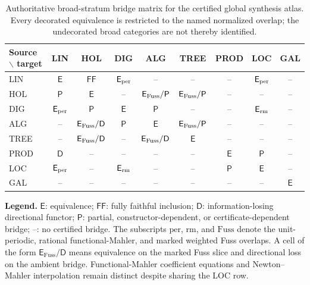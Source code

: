 \begin{landscape}
\begin{table}[p]
\centering
\caption{Authoritative broad-stratum bridge matrix for the certified global synthesis atlas. Every decorated equivalence is restricted to the named normalized overlap; the undecorated broad categories are not thereby identified.}
\label{tab:block13-bridge-matrix}
\scriptsize
\setlength{\tabcolsep}{3.7pt}
\begin{tabular}{@{}lcccccccc@{}}
\toprule
Source $\backslash$ target & LIN & HOL & DIG & ALG & TREE & PROD & LOC & GAL\\
\midrule
LIN  & $\mathsf E$ & $\mathsf{FF}$ & $\mathsf E_{\rm per}$ & -- & -- & -- & $\mathsf E_{\rm per}$ & --\\
HOL  & $\mathsf P$ & $\mathsf E$ & -- & $\mathsf E_{\rm Fuss}/\mathsf P$ & $\mathsf E_{\rm Fuss}/\mathsf P$ & -- & -- & --\\
DIG  & $\mathsf E_{\rm per}$ & $\mathsf P$ & $\mathsf E$ & $\mathsf P$ & -- & -- & $\mathsf E_{\rm rm}$ & --\\
ALG  & -- & $\mathsf E_{\rm Fuss}/\mathsf D$ & $\mathsf P$ & $\mathsf E$ & $\mathsf E_{\rm Fuss}/\mathsf P$ & -- & -- & --\\
TREE & -- & $\mathsf E_{\rm Fuss}/\mathsf D$ & -- & $\mathsf E_{\rm Fuss}/\mathsf D$ & $\mathsf E$ & -- & -- & --\\
PROD & $\mathsf D$ & -- & -- & -- & -- & $\mathsf E$ & $\mathsf P$ & --\\
LOC  & $\mathsf E_{\rm per}$ & -- & $\mathsf E_{\rm rm}$ & -- & -- & $\mathsf P$ & $\mathsf E$ & --\\
GAL  & -- & -- & -- & -- & -- & -- & -- & $\mathsf E$\\
\bottomrule
\end{tabular}
\vspace{5pt}
\parbox{0.96\linewidth}{\scriptsize
\textbf{Legend.} $\mathsf E$: equivalence; $\mathsf{FF}$: fully faithful inclusion; $\mathsf D$: information-losing directional functor; $\mathsf P$: partial, constructor-dependent, or certificate-dependent bridge; --: no certified bridge. The subscripts $\mathrm{per}$, $\mathrm{rm}$, and $\mathrm{Fuss}$ denote the unit-periodic, rational functional-Mahler, and marked weighted Fuss overlaps. A cell of the form $\mathsf E_{\mathrm{Fuss}}/\mathsf D$ means equivalence on the marked Fuss slice and directional loss on the ambient bridge. Functional-Mahler coefficient equations and Newton--Mahler interpolation remain distinct despite sharing the LOC row.}
\end{table}
\end{landscape}
